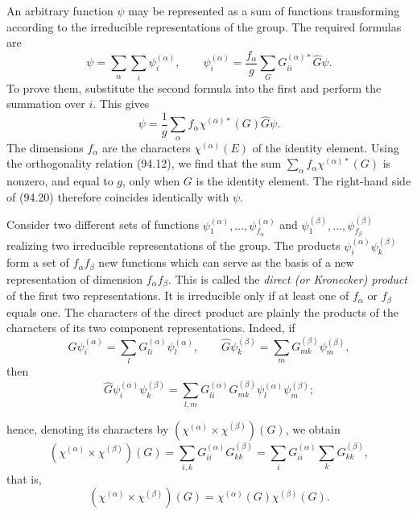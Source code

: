An arbitrary function $\psi$ may be represented as a sum of functions transforming according to the irreducible representations of the group. The required formulas are
\begin{equation}
 \psi=\sum_\alpha\sum_i\psi_i^{(\alpha)},\qquad
 \psi_i^{(\alpha)}=\frac{f_\alpha}{g}\sum_GG_{ii}^{(\alpha)*}\widehat G\psi.
 \tag{94.19}
\end{equation}
To prove them, substitute the second formula into the first and perform the summation over $i$. This gives
\begin{equation}
 \psi=\frac1g\sum_\alpha f_\alpha\chi^{(\alpha)*}(G)\widehat G\psi.
 \tag{94.20}
\end{equation}
The dimensions $f_\alpha$ are the characters $\chi^{(\alpha)}(E)$ of the identity element. Using the orthogonality relation (94.12), we find that the sum $\sum_\alpha f_\alpha\chi^{(\alpha)*}(G)$ is nonzero, and equal to $g$, only when $G$ is the identity element. The right-hand side of (94.20) therefore coincides identically with $\psi$.

Consider two different sets of functions $\psi_1^{(\alpha)},\ldots,\psi_{f_\alpha}^{(\alpha)}$ and $\psi_1^{(\beta)},\ldots,\psi_{f_\beta}^{(\beta)}$ realizing two irreducible representations of the group. The products $\psi_i^{(\alpha)}\psi_k^{(\beta)}$ form a set of $f_\alpha f_\beta$ new functions which can serve as the basis of a new representation of dimension $f_\alpha f_\beta$. This is called the \emph{direct (or Kronecker) product} of the first two representations. It is irreducible only if at least one of $f_\alpha$ or $f_\beta$ equals one. The characters of the direct product are plainly the products of the characters of its two component representations. Indeed, if
\[
 \widehat G\psi_i^{(\alpha)}=\sum_lG_{li}^{(\alpha)}\psi_l^{(\alpha)},\qquad
 \widehat G\psi_k^{(\beta)}=\sum_mG_{mk}^{(\beta)}\psi_m^{(\beta)},
\]
then
\[
 \widehat G\psi_i^{(\alpha)}\psi_k^{(\beta)}=
 \sum_{l,m}G_{li}^{(\alpha)}G_{mk}^{(\beta)}\psi_l^{(\alpha)}\psi_m^{(\beta)};
\]

hence, denoting its characters by $(\chi^{(\alpha)}\mathbin{\times}\chi^{(\beta)})(G)$, we obtain
\[
 (\chi^{(\alpha)}\mathbin{\times}\chi^{(\beta)})(G)
 =\sum_{i,k}G_{ii}^{(\alpha)}G_{kk}^{(\beta)}
 =\sum_iG_{ii}^{(\alpha)}\sum_kG_{kk}^{(\beta)},
\]
that is,
\begin{equation}
 (\chi^{(\alpha)}\mathbin{\times}\chi^{(\beta)})(G)
 =\chi^{(\alpha)}(G)\chi^{(\beta)}(G).
 \tag{94.21}
\end{equation}

